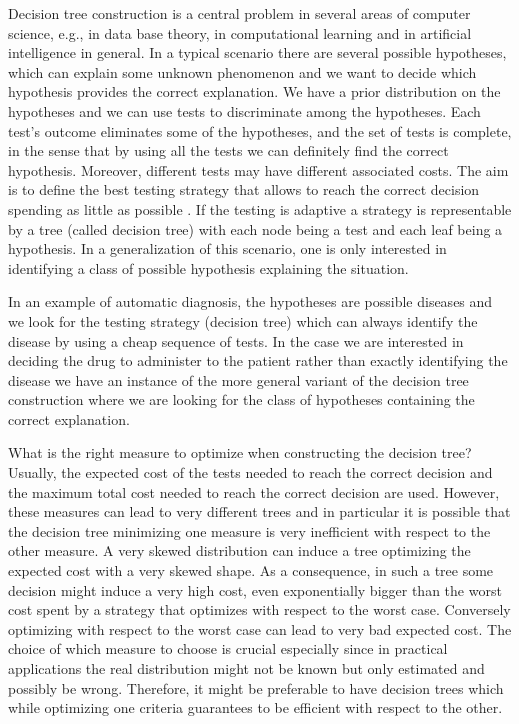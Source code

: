 \documentclass{llncs}
\begin{document}
Decision tree construction is a central problem in several areas of computer science, e.g., in data base theory, in computational learning and in artificial intelligence in general. 
In a typical scenario there are several possible hypotheses, which can explain some unknown phenomenon and we want to decide which hypothesis provides the 
correct explanation. We have a prior distribution on the hypotheses and we can use tests to
discriminate among the hypotheses. Each test's outcome eliminates some of the hypotheses, and the set of tests 
is complete, in the sense that by using all the tests we can definitely find the correct hypothesis. Moreover, different tests may have different associated costs. 
The aim is to define the best testing strategy that allows to reach the correct decision spending as little as possible	. 
If the testing is adaptive a strategy is representable by a tree (called decision tree) with each node being a test and each leaf being a hypothesis. 
In a generalization of this scenario, one is only interested in identifying a class of possible hypothesis explaining the situation. 

In an example of automatic diagnosis, the hypotheses
 are possible diseases and we look for the testing strategy (decision tree) which can always identify the disease by using a cheap sequence of tests. 
In the case we are interested in deciding the drug to administer to the patient rather than exactly identifying the disease we have an instance of the more general variant 
of the decision tree construction where we are looking for the class of hypotheses containing the correct explanation. 

What is the right measure to optimize when constructing the  decision tree? Usually, the expected cost of the tests needed to reach the correct decision and
the maximum total cost needed to reach the correct decision are used. However, these measures can lead to very different trees and in 
particular it is possible that the decision tree minimizing one measure is very inefficient with respect to the other measure. A very skewed distribution can induce
 a tree optimizing the expected cost with a very skewed shape. As a consequence, in such a tree some decision might induce a very high cost, even exponentially bigger than 
 the worst cost spent by a strategy that optimizes with respect to the worst case. Conversely optimizing with respect to the worst case can lead to very 
 bad expected cost. The choice of which measure to choose is crucial especially since in practical applications the real distribution might not be known but only 
 estimated and possibly be wrong. Therefore, it might  be preferable to have decision trees which while optimizing one criteria guarantees to be 
 efficient with respect to the other. 
 
\end{document}
